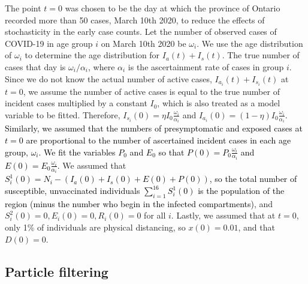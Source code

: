 \documentclass[10pt,onecolumn,twoside,lineno]{pnas-new}
\begin{document}
The point $t = 0$ was chosen to be the day at which the province of Ontario recorded more than 50 cases, March 10th 2020, to reduce the effects of stochasticity in the early case counts. Let the number of observed cases of COVID-19 in age group $i$ on March 10th 2020 be $\omega_i$. We use the age distribution of $\omega_i$ to determine the age distribution for $I_a(t) + I_s(t)$. The true number of cases that day is $\omega_i / \alpha_i$, where $\alpha_i$ is the ascertainment rate of cases in group $i$. Since we do not know the actual number of active cases, $I_{a_i}(t) + I_{s_i}(t)$ at $t = 0$, we assume the number of active cases is equal to the true number of incident cases multiplied by a constant $I_0$, which is also treated as a model variable to be fitted. Therefore, $I_{s_i}(0) = \eta I_0 \frac{\omega_i}{\alpha_i}$ and $I_{a_i}(0) = (1 - \eta) I_0 \frac{\omega_i}{\alpha_i}$.
\textcolor{black}{Similarly, we assumed that the numbers of presymptomatic and exposed cases at $t = 0$ are proportional to the number of ascertained incident cases in each age group, $\omega_i$. We fit the variables $P_0$ and $E_0$ so that $P(0) = P_0 \frac{\omega_i}{\alpha_i}$ and  $E(0) = E_0 \frac{\omega_i}{\alpha_i}$.} We assumed that\textcolor{black}{$S^1_i(0) = N_i  - (I_a(0) + I_s(0) + E(0) + P(0))$, so the total number of susceptible, unvaccinated individuals $\sum_{i = 1}^{16} S^1_i(0)$ is the population of the region (minus the number who begin in the infected compartments)}, and $S^2_i(0) = 0, E_i(0) = 0, R_i(0) = 0$ for all $i$. Lastly, we assumed that at $t = 0$, only 1\% of individuals are physical distancing, so $x(0) = 0.01$, and that $D(0) = 0$.

\subsection*{Particle filtering}
\end{document}

